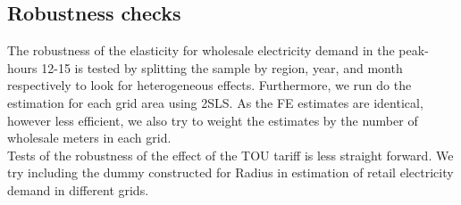 \subsection{Robustness checks}
\label{subsec:e_robustness}
The robustness of the elasticity for wholesale electricity demand in the peak-hours 12-15 is tested by splitting the sample by region, year, and month respectively to look for heterogeneous effects. Furthermore, we run do the estimation for each grid area using 2SLS. As the FE estimates are identical, however less efficient, we also try to weight the estimates by the number of wholesale meters in each grid.
\medskip\\
Tests of the robustness of the effect of the TOU tariff is less straight forward. We try including the dummy constructed for Radius in estimation of retail electricity demand in different grids.
